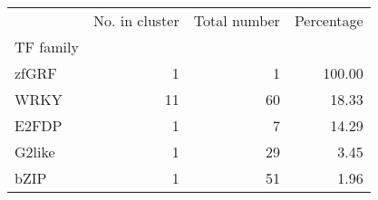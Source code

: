 \begin{tabular}{lrrr}
\toprule
{} &  No. in cluster &  Total number &  Percentage \\
TF family &                 &               &             \\
\midrule
zfGRF     &               1 &             1 &      100.00 \\
WRKY      &              11 &            60 &       18.33 \\
E2FDP     &               1 &             7 &       14.29 \\
G2like    &               1 &            29 &        3.45 \\
bZIP      &               1 &            51 &        1.96 \\
\bottomrule
\end{tabular}
